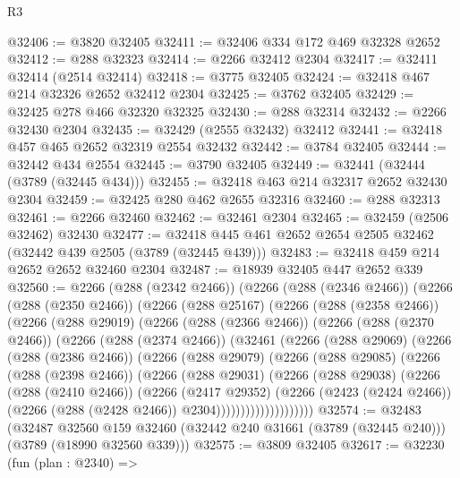 \begin{lexlean}{R3}
\begin{coremodule}
@32406 := @3820 @32405
@32411 := @32406 @334 @172 @469 @32328 @2652
@32412 := @288 @32323
@32414 := @2266 @32412 @2304
@32417 := @32411 @32414 (@2514 @32414)
@32418 := @3775 @32405
@32424 := @32418 @467 @214 @32326 @2652 @32412 @2304
@32425 := @3762 @32405
@32429 := @32425 @278 @466 @32320 @32325
@32430 := @288 @32314
@32432 := @2266 @32430 @2304
@32435 := @32429 (@2555 @32432) @32412
@32441 := @32418 @457 @465 @2652 @32319 @2554 @32432
@32442 := @3784 @32405
@32444 := @32442 @434 @2554
@32445 := @3790 @32405
@32449 := @32441 (@32444 (@3789 (@32445 @434)))
@32455 := @32418 @463 @214 @32317 @2652 @32430 @2304
@32459 := @32425 @280 @462 @2655 @32316
@32460 := @288 @32313
@32461 := @2266 @32460
@32462 := @32461 @2304
@32465 := @32459 (@2506 @32462) @32430
@32477 := @32418 @445 @461 @2652 @2654 @2505 @32462 (@32442 @439 @2505 (@3789 (@32445 @439)))
@32483 := @32418 @459 @214 @2652 @2652 @32460 @2304
@32487 := @18939 @32405 @447 @2652 @339
@32560 := @2266
    (@288 (@2342 @2466))
    (@2266
      (@288 (@2346 @2466))
      (@2266
        (@288 (@2350 @2466))
        (@2266
          (@288 @25167)
          (@2266
            (@288 (@2358 @2466))
            (@2266
              (@288 @29019)
              (@2266
                (@288 (@2366 @2466))
                (@2266
                  (@288 (@2370 @2466))
                  (@2266
                    (@288 (@2374 @2466))
                    (@32461
                      (@2266
                        (@288 @29069)
                        (@2266
                          (@288 (@2386 @2466))
                          (@2266
                            (@288 @29079)
                            (@2266
                              (@288 @29085)
                              (@2266
                                (@288 (@2398 @2466))
                                (@2266
                                  (@288 @29031)
                                  (@2266
                                    (@288 @29038)
                                    (@2266
                                      (@288 (@2410 @2466))
                                      (@2266
                                        (@2417 @29352)
                                        (@2266
                                          (@2423 (@2424 @2466))
                                          (@2266 (@288 (@2428 @2466)) @2304))))))))))))))))))))
@32574 := @32483
    (@32487
      @32560
      @159
      @32460
      (@32442 @240 @31661 (@3789 (@32445 @240)))
      (@3789 (@18990 @32560 @339)))
@32575 := @3809 @32405
@32617 := @32230
    (fun (plan : @2340) =>

\end{coremodule}
\end{lexlean}
